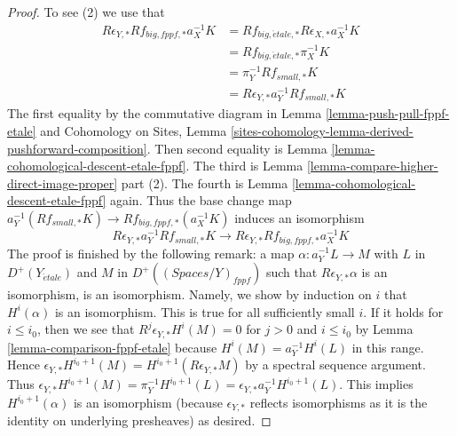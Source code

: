 \documentclass{stacks-project}
\theoremstyle{plain}
\theoremstyle{definition}
\theoremstyle{remark}
\numberwithin{equation}{subsection}
\def\etale{{\acute{e}tale}}
\begin{document}
\begin{proof}
\medskip\noindent
To see (2) we use that
\begin{align*}
R\epsilon_{Y, *}Rf_{big, fppf, *}a_X^{-1}K
& =
Rf_{big, \etale, *}R\epsilon_{X, *}a_X^{-1}K \\
& =
Rf_{big, \etale, *}\pi_X^{-1}K \\
& =
\pi_Y^{-1}Rf_{small, *}K \\
& =
R\epsilon_{Y, *} a_Y^{-1}Rf_{small, *}K
\end{align*}
The first equality by the commutative diagram in
Lemma \ref{lemma-push-pull-fppf-etale}
and Cohomology on Sites, Lemma
\ref{sites-cohomology-lemma-derived-pushforward-composition}.
Then second equality is Lemma \ref{lemma-cohomological-descent-etale-fppf}.
The third is
Lemma \ref{lemma-compare-higher-direct-image-proper} part (2).
The fourth is Lemma \ref{lemma-cohomological-descent-etale-fppf} again.
Thus the base change map
$a_Y^{-1}(Rf_{small, *}K) \to Rf_{big, fppf, *}(a_X^{-1}K)$
induces an isomorphism
$$
R\epsilon_{Y, *}a_Y^{-1}Rf_{small, *}K \to
R\epsilon_{Y, *}Rf_{big, fppf, *}a_X^{-1}K
$$
The proof is finished by the following remark: a map
$\alpha : a_Y^{-1}L \to M$ with $L$ in $D^+(Y_\etale)$
and $M$ in $D^+((\textit{Spaces}/Y)_{fppf})$ such that
$R\epsilon_{Y, *}\alpha$ is an isomorphism, is an isomorphism. Namely, 
we show by induction on $i$ that $H^i(\alpha)$ is an isomorphism.
This is true for all sufficiently small $i$.
If it holds for $i \leq i_0$, then we see that
$R^j\epsilon_{Y, *}H^i(M) = 0$ for $j > 0$ and $i \leq i_0$
by Lemma \ref{lemma-comparison-fppf-etale}
because $H^i(M) = a_Y^{-1}H^i(L)$ in this range.
Hence $\epsilon_{Y, *}H^{i_0 + 1}(M) = H^{i_0 + 1}(R\epsilon_{Y, *}M)$
by a spectral sequence argument.
Thus $\epsilon_{Y, *}H^{i_0 + 1}(M) = \pi_Y^{-1}H^{i_0 + 1}(L) =
\epsilon_{Y, *}a_Y^{-1}H^{i_0 + 1}(L)$.
This implies $H^{i_0 + 1}(\alpha)$ is an isomorphism
(because $\epsilon_{Y, *}$ reflects isomorphisms as it is the
identity on underlying presheaves) as desired.
\end{proof}
\end{document}
